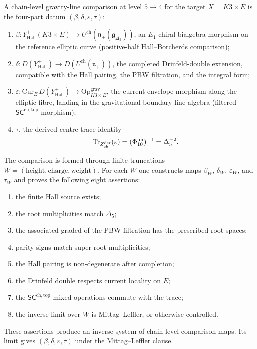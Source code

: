 \begin{convention}
\label{conv:master-hall-borcherds-datum}
A chain-level gravity-line comparison at level $5 \to 4$ for the
target $X = K3 \times E$ is the four-part datum
$(\beta, \delta, \varepsilon, \tau)$:
\begin{enumerate}[label=\textup{(\arabic*)}]
\item $\beta\colon Y^+_{\mathrm{Hall}}(K3 \times E)
\to U^{\mathrm{ch}}(\mathfrak n_+(\mathfrak g_{\Delta_5}))$,
an $E_1$-chiral bialgebra morphism on the reference elliptic curve
\textup{(}positive-half Hall--Borcherds comparison\textup{)};
\item $\delta\colon D(Y^+_{\mathrm{Hall}})
\to D(U^{\mathrm{ch}}(\mathfrak n_+))$,
the completed Drinfeld-double extension, compatible with the Hall
pairing, the PBW filtration, and the integral form;
\item $\varepsilon\colon \mathrm{Cur}_E\, D(Y^+_{\mathrm{Hall}})
\to \mathrm{Op}^{\mathrm{grav}}_{K3 \times E}$,
the current-envelope morphism along the elliptic fibre, landing in the
gravitational boundary line algebra
\textup{(}filtered $\mathsf{SC}^{\mathrm{ch,top}}$-morphism\textup{)};
\item $\tau$, the derived-centre trace identity
\[
\operatorname{Tr}_{Z^{\mathrm{der}}_{\mathrm{ch}}}(\varepsilon)
 = (\Phi_{10}^{\mathrm{un}})^{-1} = \Delta_5^{-2}.
\]
\end{enumerate}
The comparison is formed through finite truncations
$W=(\text{height},\text{charge},\text{weight})$.  For each $W$ one
constructs maps $\beta_W$, $\delta_W$, $\varepsilon_W$, and
$\tau_W$ and proves the following eight assertions:
\begin{enumerate}[label=\textup{(C\arabic*)}]
\item the finite Hall source exists;
\item the root multiplicities match $\Delta_5$;
\item the associated graded of the PBW filtration has the prescribed
root spaces;
\item parity signs match super-root multiplicities;
\item the Hall pairing is non-degenerate after completion;
\item the Drinfeld double respects current locality on $E$;
\item the $\mathsf{SC}^{\mathrm{ch,top}}$ mixed operations commute
with the trace;
\item the inverse limit over $W$ is Mittag--Leffler, or otherwise
controlled.
\end{enumerate}
These assertions produce an inverse system of chain-level comparison
maps.  Its limit gives $(\beta,\delta,\varepsilon,\tau)$ under the
Mittag--Leffler clause.


\end{convention}
